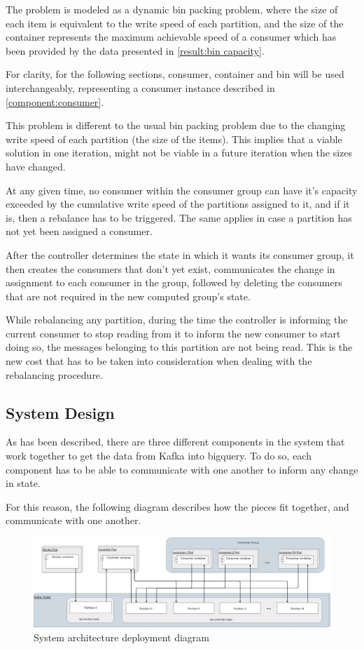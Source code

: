 The problem is modeled as a dynamic bin packing problem, where the size of each
item is equivalent to the write speed of each partition, and the size of the
container represents the maximum achievable speed of a consumer which has been
provided by the data presented in \ref{result:bin capacity}.

For clarity, for the following sections, consumer, container and bin will be
used interchangeably, representing a consumer instance described in
\ref{component:consumer}.

This problem is different to the usual bin packing problem due to the changing
write speed of each partition (the size of the items). This implies that a
viable solution in one iteration, might not be viable in a future iteration when
the sizes have changed.

At any given time, no consumer within the consumer group can have it's capacity
exceeded by the cumulative write speed of the partitions assigned to it, and if
it is, then a rebalance has to be triggered. The same applies in case a
partition has not yet been assigned a consumer.

After the controller determines the state in which it wants its consumer group,
it then creates the consumers that don't yet exist, communicates the change in
assignment to each consumer in the group, followed by deleting the consumers
that are not required in the new computed group's state.

While rebalancing any partition, during the time the controller is informing the
current consumer to stop reading from it to inform the new consumer to start
doing so, the messages belonging to this partition are not being read. This is
the new cost that has to be taken into consideration when dealing with the
rebalancing procedure.

\subsection{System Design}

As has been described, there are three different components in the system that
work together to get the data from Kafka into bigquery. To do so, each component
has to be able to communicate with one another to inform any change in state. 

For this reason, the following diagram describes how the pieces fit together,
and communicate with one another.

\begin{figure}[H] \centering
\includegraphics[width=\textwidth]{images/controller/System Design.png}
\caption{System architecture deployment diagram} \label{fig:system_architecture}
\end{figure}

